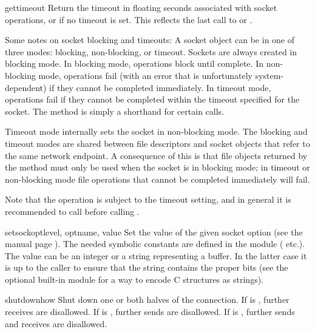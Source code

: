 \begin{methoddesc}[socket]{gettimeout}{}
Return the timeout in floating seconds associated with socket
operations, or  if no timeout is set.  This reflects
the last call to  or .
\end{methoddesc}

Some notes on socket blocking and timeouts: A socket object can be in
one of three modes: blocking, non-blocking, or timeout.  Sockets are
always created in blocking mode.  In blocking mode, operations block
until complete.  In non-blocking mode, operations fail (with an error
that is unfortunately system-dependent) if they cannot be completed
immediately.  In timeout mode, operations fail if they cannot be
completed within the timeout specified for the socket.  The
 method is simply a shorthand for certain
 calls.

Timeout mode internally sets the socket in non-blocking mode.  The
blocking and timeout modes are shared between file descriptors and
socket objects that refer to the same network endpoint.  A consequence
of this is that file objects returned by the 
method must only be used when the socket is in blocking mode; in
timeout or non-blocking mode file operations that cannot be completed
immediately will fail.

Note that the  operation is subject to the timeout
setting, and in general it is recommended to call
 before calling .

\begin{methoddesc}[socket]{setsockopt}{level, optname, value}
Set the value of the given socket option (see the \UNIX{} manual page
).  The needed symbolic constants are defined in
the  module ( etc.).  The value can be an
integer or a string representing a buffer.  In the latter case it is
up to the caller to ensure that the string contains the proper bits
(see the optional built-in module
 for a way to encode C
structures as strings). 
\end{methoddesc}

\begin{methoddesc}[socket]{shutdown}{how}
Shut down one or both halves of the connection.  If  is
, further receives are disallowed.  If  is ,
further sends are disallowed.  If  is , further sends
and receives are disallowed.
\end{methoddesc}

